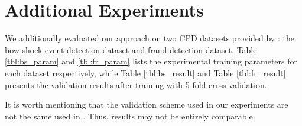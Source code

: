 \documentclass{article}
\begin{document}
\section{Additional Experiments}
\label{appendix:cpd_experiment}

We additionally evaluated our approach on two CPD datasets provided by \citep{azib2023}: the bow shock event detection dataset and fraud-detection dataset. Table \ref{tbl:bs_param} and \ref{tbl:fr_param} lists the experimental training parameters for each dataset respectively, while Table \ref{tbl:bs_result}  and Table \ref{tbl:fr_result} presents the validation results after training with 5 fold cross validation.

It is worth mentioning that the validation scheme used in our experiments are not the same used in \citep{azib2023}. Thus, results may not be entirely comparable.
\end{document}
